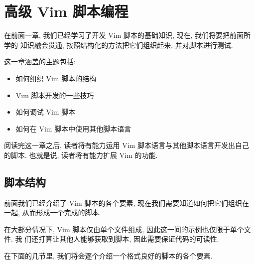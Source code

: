 \chapter{高级 Vim 脚本编程}
\label{chap:extended_vim_scripting}

在前面一章, 我们已经学习了开发 Vim 脚本的基础知识, 现在, 我们将要把前面所学的
知识融会贯通, 按照结构化的方法把它们组织起来, 并对脚本进行测试.

这一章涵盖的主题包括:
\begin{itemize}
    \item 如何组织 Vim 脚本的结构
    \item Vim 脚本开发的一些技巧
    \item 如何调试 Vim 脚本
    \item 如何在 Vim 脚本中使用其他脚本语言
\end{itemize}

阅读完这一章之后, 读者将有能力运用 Vim 脚本语言与其他脚本语言开发出自己的脚本.
也就是说, 读者将有能力扩展 Vim 的功能.

\section{脚本结构}
\label{sec:script_structure}

前面我们已经介绍了 Vim 脚本的各个要素, 现在我们需要知道如何把它们组织在一起,
从而形成一个完成的脚本.

在大部分情况下, Vim 脚本仅由单个文件组成, 因此这一间的示例也仅限于单个文件. 我
们还打算让其他人能够获取到脚本, 因此需要保证代码的可读性.

在下面的几节里, 我们将会逐个介绍一个格式良好的脚本的各个要素.
